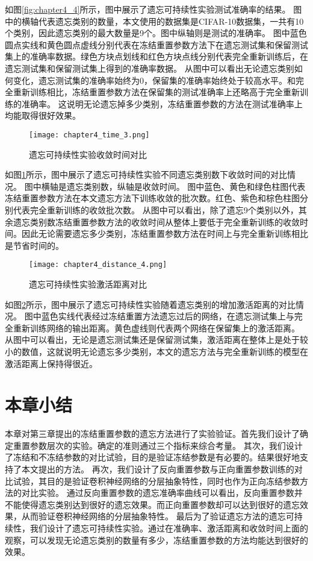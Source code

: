 如图\ref{fig:chapter4_4}所示，图中展示了遗忘可持续性实验测试准确率的结果。
图中的横轴代表遗忘类别的数量，本文使用的数据集是CIFAR-10数据集，一共有10个类别，因此遗忘类别的最大数量是9个。图中纵轴则是测试的准确率。
图中蓝色圆点实线和黄色圆点虚线分别代表在冻结重置参数方法下在遗忘测试集和保留测试集上的准确率数据。绿色方块点划线和红色方块点线分别代表完全重新训练后，在遗忘测试集和保留测试集上得到的准确率数据。
从图中可以看出无论遗忘类别如何变化，遗忘测试集的准确率始终为0，保留集的准确率始终处于较高水平。和完全重新训练相比，冻结重置参数方法在保留集的测试准确率上还略高于完全重新训练的准确率。
这说明无论遗忘掉多少类别，冻结重置参数的方法在测试准确率上均能取得很好效果。

\begin{figure}
    \centering
    \texttt{[image: chapter4\_time\_3.png]}
    \caption{遗忘可持续性实验收敛时间对比}
    \label{fig:chapter4_time_3}
\end{figure}

如图\ref{fig:chapter4_time_3}所示，图中展示了遗忘可持续性实验不同遗忘类别数下收敛时间的对比情况。
图中横轴是遗忘类别数，纵轴是收敛时间。
图中蓝色、黄色和绿色柱图代表冻结重置参数方法在本文遗忘方法下训练收敛的批次数。红色、紫色和棕色柱图分别代表完全重新训练的收敛批次数。
从图中可以看出，除了遗忘9个类别以外，其余遗忘类别数冻结重置参数方法的收敛时间从整体上要低于完全重新训练的收敛时间。因此无论需要遗忘多少类别，冻结重置参数方法在时间上与完全重新训练相比是节省时间的。

\begin{figure}
    \centering
    \texttt{[image: chapter4\_distance\_4.png]}
    \caption{遗忘可持续性实验激活距离对比}
    \label{fig:chapter4_distance_4}
\end{figure}

如图\ref{fig:chapter4_distance_4}所示，图中展示了遗忘可持续性实验随着遗忘类别的增加激活距离的对比情况。
图中蓝色实线代表经过冻结重置方法遗忘过后的网络，在遗忘测试集上与完全重新训练网络的输出距离。黄色虚线则代表两个网络在保留集上的激活距离。
从图中可以看出，无论是遗忘测试集还是保留测试集，激活距离在整体上是处于较小的数值，这就说明无论遗忘多少类别，本文的遗忘方法与完全重新训练的模型在激活距离上保持得很近。

\section{本章小结}
本章对第三章提出的冻结重置参数的遗忘方法进行了实验验证。首先我们设计了确定重置参数层次的实验。确定的准则通过三个指标来综合考量。
其次，我们设计了冻结和不冻结参数的对比试验，目的是验证冻结参数是有必要的。结果很好地支持了本文提出的方法。
再次，我们设计了反向重置参数与正向重置参数训练的对比试验，其目的是验证卷积神经网络的分层抽象特性，同时也作为正向冻结参数方法的对比实验。
通过反向重置参数的遗忘准确率曲线可以看出，反向重置参数并不能使得遗忘类别达到很好的遗忘效果。而正向重置参数却可以达到很好的遗忘效果，从而验证卷积神经网络的分层抽象特性。
最后为了验证遗忘方法的遗忘可持续性，我们设计了遗忘可持续性实验。通过在准确率、激活距离和收敛时间上面的观察，可以发现无论遗忘类别的数量有多少，冻结重置参数的方法均能达到很好的效果。

